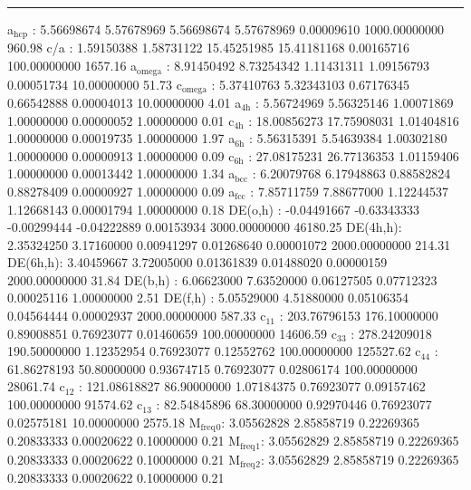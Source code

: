 \documentclass[11pt]{article}
\begin{document}
\noindent\rule{\textwidth}{0.5pt}
a\(_{\text{hcp}}\)   :   5.56698674   5.57678969   5.56698674   5.57678969   0.00009610 1000.00000000       960.98
c/a     :   1.59150388   1.58731122  15.45251985  15.41181168   0.00165716 100.00000000      1657.16
a\(_{\text{omega}}\) :   8.91450492   8.73254342   1.11431311   1.09156793   0.00051734  10.00000000        51.73
c\(_{\text{omega}}\) :   5.37410763   5.32343103   0.67176345   0.66542888   0.00004013  10.00000000         4.01
a\(_{\text{4h}}\)    :   5.56724969   5.56325146   1.00071869   1.00000000   0.00000052   1.00000000         0.01
c\(_{\text{4h}}\)    :  18.00856273  17.75908031   1.01404816   1.00000000   0.00019735   1.00000000         1.97
a\(_{\text{6h}}\)    :   5.56315391   5.54639384   1.00302180   1.00000000   0.00000913   1.00000000         0.09
c\(_{\text{6h}}\)    :  27.08175231  26.77136353   1.01159406   1.00000000   0.00013442   1.00000000         1.34
a\(_{\text{bcc}}\)   :   6.20079768   6.17948863   0.88582824   0.88278409   0.00000927   1.00000000         0.09
a\(_{\text{fcc}}\)   :   7.85711759   7.88677000   1.12244537   1.12668143   0.00001794   1.00000000         0.18
DE(o,h) :  -0.04491667  -0.63343333  -0.00299444  -0.04222889   0.00153934 3000.00000000     46180.25
DE(4h,h):   2.35324250   3.17160000   0.00941297   0.01268640   0.00001072 2000.00000000       214.31
DE(6h,h):   3.40459667   3.72005000   0.01361839   0.01488020   0.00000159 2000.00000000        31.84
DE(b,h) :   6.06623000   7.63520000   0.06127505   0.07712323   0.00025116   1.00000000         2.51
DE(f,h) :   5.05529000   4.51880000   0.05106354   0.04564444   0.00002937 2000.00000000       587.33
c\(_{\text{11}}\)    : 203.76796153 176.10000000   0.89008851   0.76923077   0.01460659 100.00000000     14606.59
c\(_{\text{33}}\)    : 278.24209018 190.50000000   1.12352954   0.76923077   0.12552762 100.00000000    125527.62
c\(_{\text{44}}\)    :  61.86278193  50.80000000   0.93674715   0.76923077   0.02806174 100.00000000     28061.74
c\(_{\text{12}}\)    : 121.08618827  86.90000000   1.07184375   0.76923077   0.09157462 100.00000000     91574.62
c\(_{\text{13}}\)    :  82.54845896  68.30000000   0.92970446   0.76923077   0.02575181  10.00000000      2575.18
M\(_{\text{freq}}\)\(_{\text{0}}\):   3.05562828   2.85858719   0.22269365   0.20833333   0.00020622   0.10000000         0.21
M\(_{\text{freq}}\)\(_{\text{1}}\):   3.05562829   2.85858719   0.22269365   0.20833333   0.00020622   0.10000000         0.21
M\(_{\text{freq}}\)\(_{\text{2}}\):   3.05562829   2.85858719   0.22269365   0.20833333   0.00020622   0.10000000         0.21
\end{document}
